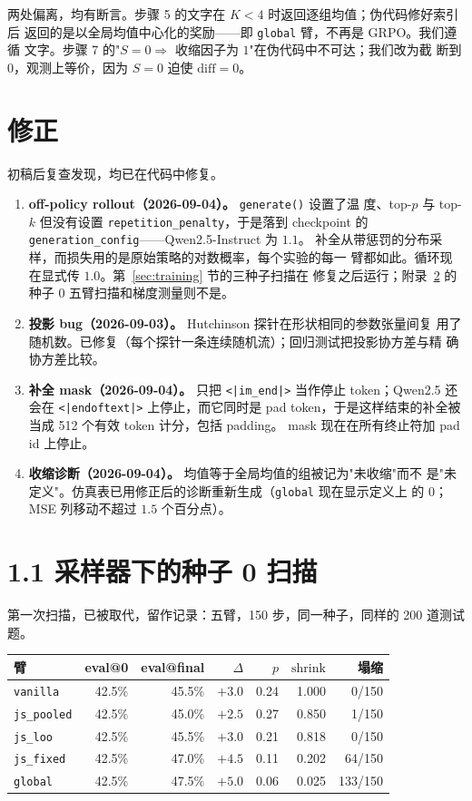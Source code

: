 \documentclass{article}
\newcommand{\shrink}{\mathrm{shrink}}
\newcommand{\arm}[1]{\texttt{#1}}
\begin{document}
两处偏离，均有断言。步骤 5 的文字在 $K<4$ 时返回逐组均值；伪代码修好索引后
返回的是以全局均值中心化的奖励——即 \arm{global} 臂，不再是 GRPO。我们遵循
文字。步骤 7 的"$S=0\Rightarrow$ 收缩因子为 $1$"在伪代码中不可达；我们改为截
断到 $0$，观测上等价，因为 $S=0$ 迫使 $\mathrm{diff}=0$。

\section{修正}
\label{app:corrections}

初稿后复查发现，均已在代码中修复。
\begin{enumerate}\itemsep2pt
\item \textbf{off-policy rollout（2026-09-04）。} \texttt{generate()} 设置了温
      度、top-$p$ 与 top-$k$ 但没有设置 \texttt{repetition\_penalty}，于是落到
      checkpoint 的 \texttt{generation\_config}——Qwen2.5-Instruct 为 $1.1$。
      补全从带惩罚的分布采样，而损失用的是原始策略的对数概率，每个实验的每一
      臂都如此。循环现在显式传 $1.0$。第~\ref{sec:training} 节的三种子扫描在
      修复之后运行；附录~\ref{app:seed0} 的种子 0 五臂扫描和梯度测量则不是。
\item \textbf{投影 bug（2026-09-03）。} Hutchinson 探针在形状相同的参数张量间复
      用了随机数。已修复（每个探针一条连续随机流）；回归测试把投影协方差与精
      确协方差比较。
\item \textbf{补全 mask（2026-09-04）。} 只把 \texttt{<|im\_end|>} 当作停止
      token；Qwen2.5 还会在 \texttt{<|endoftext|>} 上停止，而它同时是 pad
      token，于是这样结束的补全被当成 512 个有效 token 计分，包括 padding。
      mask 现在在所有终止符加 pad id 上停止。
\item \textbf{收缩诊断（2026-09-04）。} 均值等于全局均值的组被记为"未收缩"而不
      是"未定义"。仿真表已用修正后的诊断重新生成（\arm{global} 现在显示定义上
      的 $0$；MSE 列移动不超过 $1.5$ 个百分点）。
\end{enumerate}

\section{1.1 采样器下的种子 0 扫描}
\label{app:seed0}

第一次扫描，已被取代，留作记录：五臂，150 步，同一种子，同样的 200 道测试题。

\begin{center}\small
\begin{tabular}{lrrrrrr}
\toprule
臂 & eval@0 & eval@final & $\Delta$ & $p$ & $\shrink$ & 塌缩 \\
\midrule
\arm{vanilla}    & 42.5\% & 45.5\% & $+3.0$ & 0.24 & 1.000 & 0/150 \\
\arm{js\_pooled} & 42.5\% & 45.0\% & $+2.5$ & 0.27 & 0.850 & 1/150 \\
\arm{js\_loo}    & 42.5\% & 45.5\% & $+3.0$ & 0.21 & 0.818 & 0/150 \\
\arm{js\_fixed}  & 42.5\% & 47.0\% & $+4.5$ & 0.11 & 0.202 & 64/150 \\
\arm{global}     & 42.5\% & 47.5\% & $+5.0$ & 0.06 & 0.025 & 133/150 \\
\bottomrule
\end{tabular}
\end{center}
\end{document}
